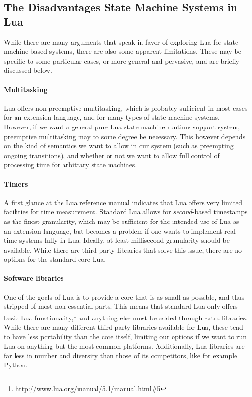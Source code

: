 \subsection{The Disadvantages State Machine Systems in Lua}
\label{sec:lua_disadvantages}
While there are many arguments that speak in favor of exploring Lua for state machine based systems, there are also some apparent limitations. These may be specific to some particular cases, or more general and pervasive, and are briefly discussed below.

\paragraph{Multitasking}
Lua offers non-preemptive multitasking, which is probably sufficient in most cases for an extension language, and for many types of state machine systems. However, if we want a general pure Lua state machine runtime support system, preemptive multitasking may to some degree be necessary. This however depends on the kind of semantics we want to allow in our system (such as preempting ongoing transitions), and whether or not we want to allow full control of processing time for arbitrary state machines.

\paragraph{Timers}
A first glance at the Lua reference manual indicates that Lua offers very limited facilities for time measurement. Standard Lua allows for \emph{second}-based timestamps as the finest granularity, which may be sufficient for the intended use of Lua as an extension language, but becomes a problem if one wants to implement real-time systems fully in Lua. Ideally, at least millisecond granularity should be available. While there are third-party libraries that solve this issue, there are no options for the standard core Lua.

\paragraph{Software libraries}
One of the goals of Lua is to provide a core that is as small as possible, and thus stripped of most non-essential parts. This means that standard Lua only offers basic Lua functionality,\footnote{\url{http://www.lua.org/manual/5.1/manual.html\#5}} and anything else must be added through extra libraries. While there are many different third-party libraries available for Lua, these tend to have less portability than the core itself, limiting our options if we want to run Lua on anything but the most common platforms. Additionally, Lua libraries are far less in number and diversity than those of its competitors, like for example Python.

